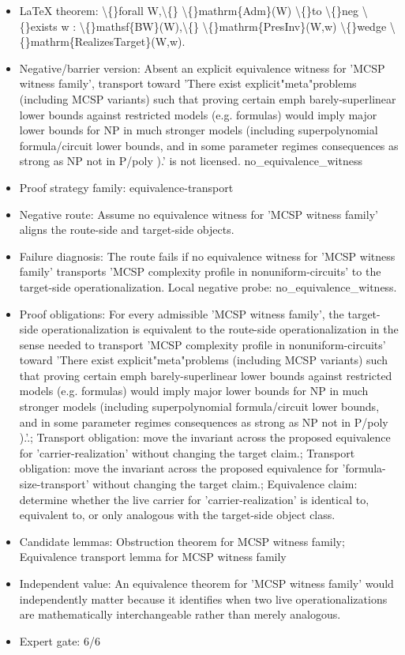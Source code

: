 \documentclass[11pt]{article}
\begin{document}
\begin{itemize}
\item LaTeX theorem: \textbackslash\{\}forall W,\textbackslash\{\} \textbackslash\{\}mathrm\{Adm\}(W) \textbackslash\{\}to \textbackslash\{\}neg \textbackslash\{\}exists w : \textbackslash\{\}mathsf\{BW\}(W),\textbackslash\{\} \textbackslash\{\}mathrm\{PresInv\}(W,w) \textbackslash\{\}wedge \textbackslash\{\}mathrm\{RealizesTarget\}(W,w).
\item Negative/barrier version: Absent an explicit equivalence witness for 'MCSP witness family', transport toward 'There exist explicit"meta"problems (including MCSP variants) such that proving certain emph barely-superlinear lower bounds against restricted models (e.g. formulas) would imply major lower bounds for NP in much stronger models (including superpolynomial formula/circuit lower bounds, and in some parameter regimes consequences as strong as NP not in P/poly ).' is not licensed. no\_equivalence\_witness
\item Proof strategy family: equivalence-transport
\item Negative route: Assume no equivalence witness for 'MCSP witness family' aligns the route-side and target-side objects.
\item Failure diagnosis: The route fails if no equivalence witness for 'MCSP witness family' transports 'MCSP complexity profile in nonuniform-circuits' to the target-side operationalization. Local negative probe: no\_equivalence\_witness.
\item Proof obligations: For every admissible 'MCSP witness family', the target-side operationalization is equivalent to the route-side operationalization in the sense needed to transport 'MCSP complexity profile in nonuniform-circuits' toward 'There exist explicit"meta"problems (including MCSP variants) such that proving certain emph barely-superlinear lower bounds against restricted models (e.g. formulas) would imply major lower bounds for NP in much stronger models (including superpolynomial formula/circuit lower bounds, and in some parameter regimes consequences as strong as NP not in P/poly ).'.; Transport obligation: move the invariant across the proposed equivalence for 'carrier-realization' without changing the target claim.; Transport obligation: move the invariant across the proposed equivalence for 'formula-size-transport' without changing the target claim.; Equivalence claim: determine whether the live carrier for 'carrier-realization' is identical to, equivalent to, or only analogous with the target-side object class.
\item Candidate lemmas: Obstruction theorem for MCSP witness family; Equivalence transport lemma for MCSP witness family
\item Independent value: An equivalence theorem for 'MCSP witness family' would independently matter because it identifies when two live operationalizations are mathematically interchangeable rather than merely analogous.
\item Expert gate: 6/6
\end{itemize}
\end{document}
